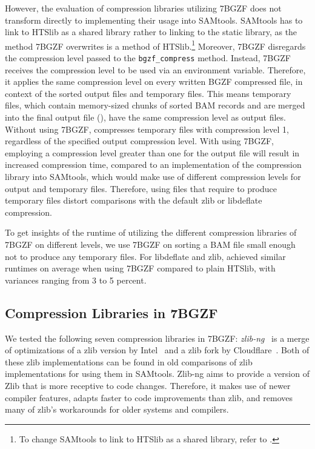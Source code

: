 However, the evaluation of compression libraries utilizing 7BGZF does not transform directly to implementing their usage into SAMtools. SAMtools has to link to HTSlib as a shared library rather to linking to the static library, as the method 7BGZF overwrites is a method of HTSlib.\footnote{To change SAMtools to link to HTSlib as a shared library, refer to .}
Moreover, 7BGZF disregards the compression level passed to the \texttt{bgzf\_compress} method. Instead, 7BGZF receives the compression level to be used via an environment variable. Therefore, it applies the same compression level on every written BGZF compressed file, in context of \sort the sorted output files and temporary files. 
This means temporary files, which contain memory-sized chunks of sorted BAM records and are merged into the final output file (), have the same compression level as output files. Without using 7BGZF, \sort compresses temporary files with compression level 1, regardless of the specified output compression level. With using 7BGZF, employing a compression level greater than one for the output file will result in increased compression time, compared to an implementation of the compression library into SAMtools, which would make use of different compression levels for output and temporary files. Therefore, using files that require \sort to produce temporary files distort comparisons with the default zlib or libdeflate compression.

To get insights of the runtime of \sort utilizing the different compression libraries of 7BGZF on different levels, we use 7BGZF on sorting a BAM file small enough not to produce any temporary files. For libdeflate and zlib, \sort achieved similar runtimes on average when using 7BGZF compared to plain HTSlib, with variances ranging from 3 to 5 percent. 

\subsection{Compression Libraries in 7BGZF}

We tested the following seven compression libraries in 7BGZF:
\textit{zlib-ng}~\cite{noauthor_zlib-ngzlib-ng_2024} is a merge of optimizations of a zlib version by Intel~\cite{noauthor_intelzlib_2024} and a zlib fork by Cloudflare~\cite{noauthor_cloudflarezlib_2024}. Both of these zlib implementations can be found in old comparisons of zlib implementations for using them in SAMtools. Zlib-ng aims to provide a version of Zlib that is more receptive to code changes. Therefore, it makes use of newer compiler features, adapts faster to code improvements than zlib, and removes many of zlib's workarounds for older systems and compilers. 

